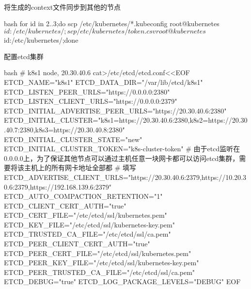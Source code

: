 \begin{outline}[enumerate]
将生成的context文件同步到其他的节点
\begin{code-in-enumerate}{bash}
for id in {2..3};do scp /etc/kubernetes/*.kubeconfig root@kubernetes$id:/etc/kubernetes/; scp /etc/kubernetes/token.csv root@kubernetes$id:/etc/kubernetes/;done
\end{code-in-enumerate}

  \1 配置etcd集群
\begin{code-in-enumerate}{bash}
# k8s1 node, 20.30.40.6
cat>/etc/etcd/etcd.conf<<EOF
ETCD_NAME="k8s1"
ETCD_DATA_DIR="/var/lib/etcd/k8s1"
ETCD_LISTEN_PEER_URLS="https://0.0.0.0:2380"
ETCD_LISTEN_CLIENT_URLS="https://0.0.0.0:2379"
ETCD_INITIAL_ADVERTISE_PEER_URLS="https://20.30.40.6:2380"
ETCD_INITIAL_CLUSTER="k8s1=https://20.30.40.6:2380,k8s2=https://20.30.40.7:2380,k8s3=https://20.30.40.8:2380"
ETCD_INITIAL_CLUSTER_STATE="new"
ETCD_INITIAL_CLUSTER_TOKEN="k8s-cluster-token"
# 由于etcd监听在0.0.0.0上，为了保证其他节点可以通过主机任意一块网卡都可以访问etcd集群，需要将该主机上的所有网卡地址全部都
# 填写
ETCD_ADVERTISE_CLIENT_URLS="https://20.30.40.6:2379,https://10.20.30.6:2379,https://192.168.139.6:2379"
ETCD_AUTO_COMPACTION_RETENTION="1"
ETCD_CLIENT_CERT_AUTH="true"
ETCD_CERT_FILE="/etc/etcd/ssl/kubernetes.pem"
ETCD_KEY_FILE="/etc/etcd/ssl/kubernetes-key.pem"
ETCD_TRUSTED_CA_FILE="/etc/etcd/ssl/ca.pem"
ETCD_PEER_CLIENT_CERT_AUTH="true"
ETCD_PEER_CERT_FILE="/etc/etcd/ssl/kubernetes.pem"
ETCD_PEER_KEY_FILE="/etc/etcd/ssl/kubernetes-key.pem"
ETCD_PEER_TRUSTED_CA_FILE="/etc/etcd/ssl/ca.pem"
ETCD_DEBUG="true"
ETCD_LOG_PACKAGE_LEVELS="DEBUG"
EOF


\end{code-in-enumerate}
\end{outline}
